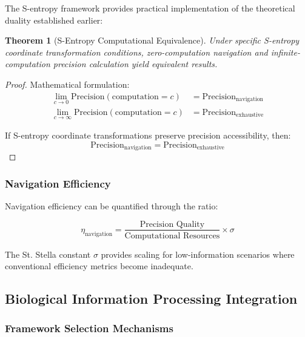 \documentclass[12pt,a4paper]{article}
\newtheorem{theorem}{Theorem}[section]
\begin{document}
{{{{{{{{{{{{{The S-entropy framework provides practical implementation of the theoretical duality established earlier:

\begin{theorem}[S-Entropy Computational Equivalence]
Under specific S-entropy coordinate transformation conditions, zero-computation navigation and infinite-computation precision calculation yield equivalent results.
\end{theorem}

\begin{proof}
Mathematical formulation:
\begin{align}
\lim_{c \to 0} \text{Precision}(\text{computation} = c) &= \text{Precision}_{\text{navigation}} \\
\lim_{c \to \infty} \text{Precision}(\text{computation} = c) &= \text{Precision}_{\text{exhaustive}}
\end{align}

If S-entropy coordinate transformations preserve precision accessibility, then:
\begin{equation}
\text{Precision}_{\text{navigation}} = \text{Precision}_{\text{exhaustive}}
\end{equation}
\end{proof}

\subsubsection{Navigation Efficiency}

Navigation efficiency can be quantified through the ratio:

\begin{equation}
\eta_{\text{navigation}} = \frac{\text{Precision Quality}}{\text{Computational Resources}} \times \sigma
\label{eq:navigation_efficiency}
\end{equation}

The St. Stella constant $\sigma$ provides scaling for low-information scenarios where conventional efficiency metrics become inadequate.

\subsection{Biological Information Processing Integration}

\subsubsection{Framework Selection Mechanisms}

}}}}}}}}}}}}}
\end{document}
